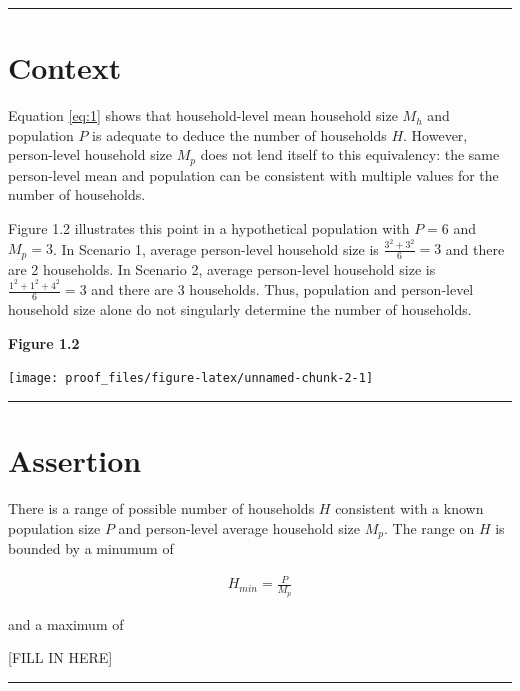 \documentclass[
]{article}
\begin{document}
\begin{center}\rule{0.5\linewidth}{0.5pt}\end{center}

\hypertarget{context}{%
\section{Context}\label{context}}

Equation \eqref{eq:1} shows that household-level mean household size
\(M_h\) and population \(P\) is adequate to deduce the number of
households \(H\). However, person-level household size \(M_p\) does not
lend itself to this equivalency: the same person-level mean and
population can be consistent with multiple values for the number of
households.

Figure 1.2 illustrates this point in a hypothetical population with
\(P = 6\) and \(M_p = 3\). In Scenario 1, average person-level household
size is \(\frac{3^2 + 3^2}{6} = 3\) and there are 2 households. In
Scenario 2, average person-level household size is
\(\frac{1^2 + 1^2 + 4^2}{6} = 3\) and there are 3 households. Thus,
population and person-level household size alone do not singularly
determine the number of households.

\textbf{Figure 1.2}

\texttt{[image: proof\_files/figure-latex/unnamed-chunk-2-1]}

\begin{center}\rule{0.5\linewidth}{0.5pt}\end{center}

\hypertarget{assertion}{%
\section{Assertion}\label{assertion}}

There is a range of possible number of households \(H\) consistent with
a known population size \(P\) and person-level average household size
\(M_p\). The range on \(H\) is bounded by a minumum of

\begin{align}
H_{min} = \frac{P}{M_p}
\end{align}

and a maximum of

{[}FILL IN HERE{]}

\begin{center}\rule{0.5\linewidth}{0.5pt}\end{center}
\end{document}
